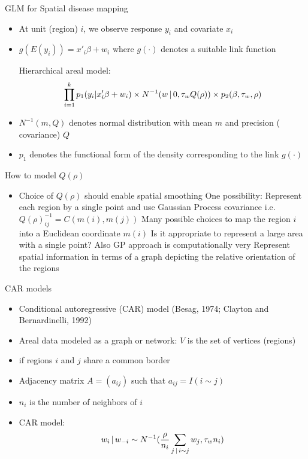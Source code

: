 \begin{frame}{GLM for Spatial disease mapping}
	\begin{itemize}
		\item At unit (region) $i$, we observe response $y_i$ and  covariate $x_i$
		\item $g(E(y_i)) = x'_i\beta + w_i $ where $g(\cdot)$ denotes a suitable link function
		\begin{alertblock}
		{Hierarchical areal model:}
		\[
		\prod_{i=1}^k p_1(y_i|x_i'\beta+w_i) \times N^{-1}(w \,|\, 0, \tau_w Q(\rho)) \times p_2(\beta,\tau_w, \rho)
		\]
		\end{alertblock}
		\item {} $N^{-1}(m,Q)$ denotes normal distribution with mean $m$ and \alert{precision} ( covariance) $Q$
		\item $p_1$ denotes the functional form of the density corresponding to the link $g(\cdot)$
	\end{itemize}
\end{frame}

\begin{frame}{How to model $Q(\rho)$}
	\begin{itemize}
		\item Choice of $Q(\rho)$ should enable spatial smoothing
		\myitem One possibility: Represent each region by a single point and use Gaussian Process covariance i.e. $Q(\rho)^{-1}_{ij} = C(m(i),m(j))$
		\myitem Many possible choices to map the region $i$ into a Euclidean coordinate $m(i)$
		\myitem Is it appropriate to represent a large area with a single point?
		\myitem Also GP approach is computationally very 
		\myitem {} Represent spatial information in terms of a graph depicting the relative orientation of the regions
	\end{itemize}
\end{frame}

\begin{frame}{CAR models}
	\begin{itemize}
		\item \alert{Conditional autoregressive (CAR)} model (Besag, 1974; Clayton and Bernardinelli, 1992)
		\item Areal data modeled as a graph or network: $V$ is the set of vertices (regions)
		\item {} if regions $i$ and $j$ share a common border
		\item \alert{Adjacency matrix $A=(a_{ij})$} such that $a_{ij}= I(i \sim j)$
		\item $n_i$ is the number of neighbors of $i$
		\item CAR model:
		\begin{equation*}
		w_i \,|\, w_{-i} \sim N^{-1}(\frac \rho{n_i}\sum_{j \,|\, i \sim j} w_j, \tau_w n_i)
		\end{equation*}
	\end{itemize}
\end{frame}

